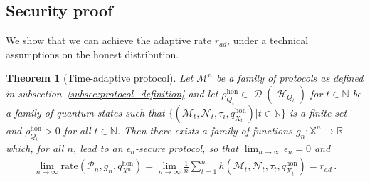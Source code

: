 \documentclass[11pt]{article}
\newcommand{\1}{\ensuremath{\mathbbm{1}}}
\theoremstyle{newdefinition}
\theoremstyle{newplain}
\newtheorem{theorem}[definition]{Theorem}
\newtheorem{proposition}[definition]{Proposition}
\theoremstyle{myplain}
\DeclareMathOperator{\cH}{\mathcal{H}}
\DeclareMathOperator{\cD}{\mathcal{D}}
\begin{document}

\subsection{Security proof}
We show that we can achieve the adaptive rate $r_{ad}$, under a technical assumptions on the honest distribution.
\begin{theorem}[Time-adaptive protocol]
    \label{thm:time_adaptive_protocol}
    Let $\mathcal{M}^n$ be a family of protocols as defined in subsection~\ref{subsec:protocol_definition} and let $\rho^{\mathrm{hon}}_{Q_t} \in \cD(\cH_{Q_t})$ for $t \in \mathbb{N}$ be a family of quantum states such that $\{(\mathcal M_t,\mathcal N_t,\mathcal \tau_i,q^{\mathrm{hon}}_{X_t})|t\in \mathbb N\}$ is a finite set and $\rho^{\mathrm{hon}}_{Q_t}> 0$ for all $t\in \mathbb N$. Then there exists a family of functions $g_n : \mathbb{X}^n\to \mathbb{R}$ which, for all $n$, lead to an $\epsilon_n$-secure protocol, so that $\lim_{n\to \infty} \epsilon_n = 0$ and  
    \begin{align}
        \lim_{n\to \infty} \mathrm{rate}(\mathcal P_n, g_n,q^{\mathrm{hon}}_{X^n}) = \lim_{n \to \infty} \frac{1}{n} \sum_{t=1}^n h(\mathcal M_t,\mathcal N_t,\tau_t,q_{X_t}^{\mathrm{hon}})= r_{ad}\,.
    \end{align} 
\end{theorem}
\end{document}
